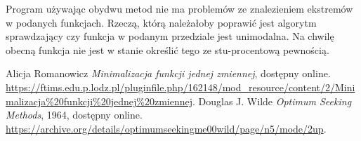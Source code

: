 \documentclass{classrep}
\begin{document}
Program używając obydwu metod nie ma problemów ze znalezieniem ekstremów w podanych funkcjach. Rzeczą, którą należałoby poprawić jest algorytm sprawdzający czy funkcja w podanym przedziale jest unimodalna. Na chwilę obecną funkcja nie jest w stanie określić tego ze stu-procentową pewnością.

\begin{thebibliography}{0}
   Alicja Romanowicz
    \textsl{Minimalizacja funkcji jednej zmiennej}, dostępny online. 
    \url{https://ftims.edu.p.lodz.pl/pluginfile.php/162148/mod_resource/content/2/Minimalizacja\%20funkcji\%20jednej\%20zmiennej}.
     Douglas J. Wilde
    \textsl{Optimum Seeking Methods}, 1964, dostępny online. 
    \url{https://archive.org/details/optimumseekingme00wild/page/n5/mode/2up}.
\end{thebibliography}
\end{document}
